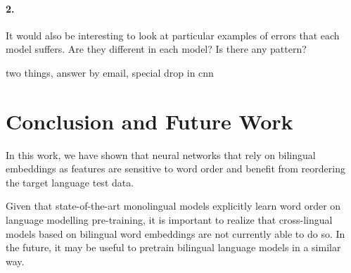 \documentclass[11pt,a4paper]{article}
\begin{document}
\paragraph{2. }It would also be interesting 
to look at particular examples 
of errors that each model suffers.
Are they different in each model?
Is there any pattern?

two things, answer by email, special drop in cnn


\section{Conclusion and Future Work}

In this work, we have shown that neural networks that rely on bilingual embeddings as features
are sensitive to word order and benefit from reordering the target language test data. 

Given that state-of-the-art monolingual models explicitly learn word order on language modelling pre-training, it is important to realize that cross-lingual models based on bilingual word embeddings are not currently able to do so. In the future, it may be useful to pretrain bilingual language models in a similar way.



\end{document}
